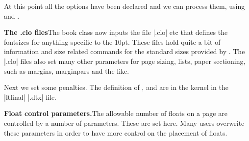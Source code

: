 \begin{teX}
\if@compatibility\else
\fi
{} 
\end{teX}

At this point all the options have been declared and we can process them, using  and .

\begin{teX}
\ProcessOptions
\end{teX}


\textbf{The .clo files}\quad The book class now inputs the file |.clo| etc that defines the fontsizes
 for anything specific to the 10pt. These files hold quite a bit of information and size related commands for the
standard sizes provided by \latex. The |.clo| files also set many other parameters for page sizing, lists, paper sectioning, such as margins, marginpars and the like.


\begin{teX}

\setlength{}
\setlength{}
\renewcommand\baselinestretch{}
\setlength\parskip{0\p@ \@plus \p@}
\end{teX}


 Next we set some penalties. The definition of ,  and  are in the kernel in the |ltfinal| |.dtx| file.

\begin{teX}
\end{teX}


\textbf{Float control parameters.}\quad The allowable number of floats on a page are controlled by a number of parameters. These are set here. Many users overwrite these parameters in order to have more control on the placement of floats.


\begin{teX}
\setcounter{topnumber}{2}
\renewcommand\topfraction{.7}
\setcounter{bottomnumber}{1}
\renewcommand\bottomfraction{.3}
\setcounter{totalnumber}{3}
\renewcommand\textfraction{.2}
\renewcommand\floatpagefraction{.5}
\setcounter{dbltopnumber}{2}
\renewcommand\dbltopfraction{.7}
\renewcommand\dblfloatpagefraction{.5}
\end{teX}


